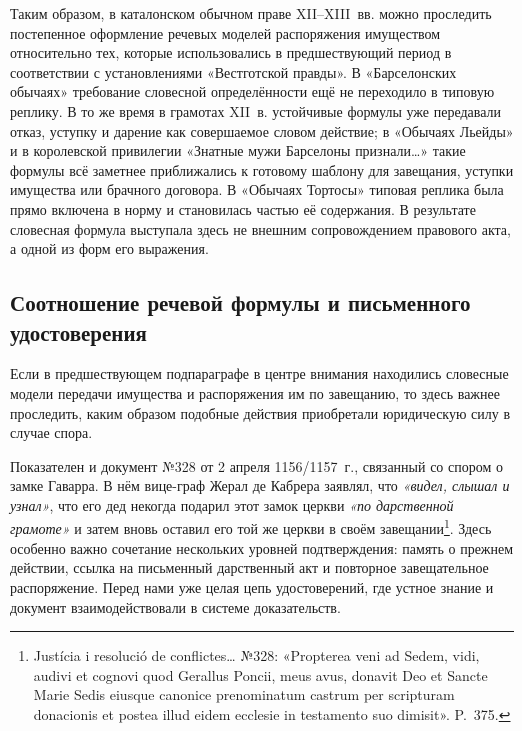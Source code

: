Таким образом, в каталонском обычном праве XII--XIII~вв. можно проследить постепенное оформление речевых моделей распоряжения имуществом относительно тех, которые использовались в предшествующий период в соответствии с установлениями «Вестготской правды». В «Барселонских обычаях» требование словесной определённости ещё не переходило в типовую реплику. В то же время в грамотах XII~в. устойчивые формулы уже передавали отказ, уступку и дарение как совершаемое словом действие; в «Обычаях Льейды» и в королевской привилегии «Знатные мужи Барселоны признали…» такие формулы всё заметнее приближались к готовому шаблону для завещания, уступки имущества или брачного договора. В «Обычаях Тортосы» типовая реплика была прямо включена в норму и становилась частью её содержания. В результате словесная формула выступала здесь не внешним сопровождением правового акта, а одной из форм его выражения.

\subsection{Соотношение речевой формулы и письменного удостоверения}

Если в предшествующем подпараграфе в центре внимания находились словесные модели передачи имущества и распоряжения им по завещанию, то здесь важнее проследить, каким образом подобные действия приобретали юридическую силу в случае спора.

Показателен и документ №328 от 2 апреля 1156/1157~г., связанный со спором о замке Гаварра. В нём вице-граф Жерал де Кабрера заявлял, что \emph{«видел, слышал и узнал»}, что его дед некогда подарил этот замок церкви \emph{«по дарственной грамоте»} и затем вновь оставил его той же церкви в своём завещании\footnote{Justícia i resolució de conflictes… №328: «Propterea veni ad Sedem, vidi, audivi et cognovi quod Gerallus Poncii, meus avus, donavit Deo et Sancte Marie Sedis eiusque canonice prenominatum castrum per scripturam donacionis et postea illud eidem ecclesie in testamento suo dimisit». P.~375.}. Здесь особенно важно сочетание нескольких уровней подтверждения: память о прежнем действии, ссылка на письменный дарственный акт и повторное завещательное распоряжение. Перед нами уже целая цепь удостоверений, где устное знание и документ взаимодействовали в системе доказательств.

